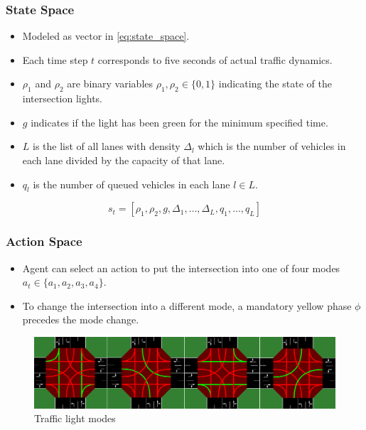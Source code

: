 \documentclass[compress,12pt]{beamer}
\begin{document}
\begin{frame}[bg=arguelles.png]
      \frametitle{State Space}
      \begin{itemize}
        \item Modeled as vector in \ref{eq:state_space}\cite{Almeida2022MultiagentRL}.
      \item Each time step \(t\) corresponds to five seconds of actual traffic dynamics.
      \item \(\rho_1\) and \(\rho_2\) are binary variables \(\rho_1, \rho_2 \in \{0, 1\}\) indicating the state of the intersection lights.
      \item \(g\) indicates if the light has been green for the minimum specified time.
      \item \(L\) is the list of all lanes with density \(\Delta_l\) which is the number of vehicles in each lane divided by the capacity of that lane.
      \item \(q_l\) is the number of queued vehicles in each lane \(l \in L\).
      \end{itemize}

\begin{equation}
s_t = [\rho_1, \rho_2, g, \Delta_1, \ldots, \Delta_L, q_1, \ldots, q_L]
\label{eq:state_space}
\end{equation}

\end{frame}

\begin{frame}[bg=arguelles.png]
      \frametitle{Action Space}
      \begin{itemize}
      \item Agent can select an action to put the intersection into one of four modes \(a_t \in \{a_1, a_2, a_3, a_4\}\).
      \item To change the intersection into a different mode, a mandatory yellow phase $\phi$ precedes the mode change.
      \end{itemize}

    \begin{figure}[htbp]
      \centering
      \includegraphics[width=0.8\linewidth]{actions.png}
      \caption{Traffic light modes}
      \label{fig:action_space}
    \end{figure}
\end{frame}
\end{document}
